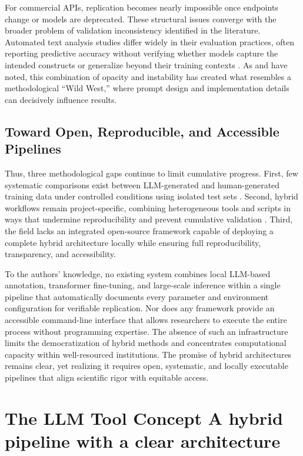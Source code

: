 \documentclass[12pt]{article}
\begin{document}
For commercial APIs, replication becomes nearly impossible once endpoints change or models are deprecated. These structural issues converge with the broader problem of validation inconsistency identified in the literature. Automated text analysis studies differ widely in their evaluation practices, often reporting predictive accuracy without verifying whether models capture the intended constructs or generalize beyond their training contexts \parencite{park_montgomery25, bernhard-harrer_etal25, glockner_etal20}. As \textcite{tornberg24b} and \textcite{atreja_etal24} have noted, this combination of opacity and instability has created what resembles a methodological “Wild West,” where prompt design and implementation details can decisively influence results.

\subsection{Toward Open, Reproducible, and Accessible Pipelines}

Thus, three methodological gaps continue to limit cumulative progress. First, few systematic comparisons exist between LLM-generated and human-generated training data under controlled conditions using isolated test sets \parencite{park_montgomery25, bernhard-harrer_etal25}. Second, hybrid workflows remain project-specific, combining heterogeneous tools and scripts in ways that undermine reproducibility and prevent cumulative validation \parencite{chen_etal23, weber_reichardt23}. Third, the field lacks an integrated open-source framework capable of deploying a complete hybrid architecture locally while ensuring full reproducibility, transparency, and accessibility. 

To the authors’ knowledge, no existing system combines local LLM-based annotation, transformer fine-tuning, and large-scale inference within a single pipeline that automatically documents every parameter and environment configuration for verifiable replication. Nor does any framework provide an accessible command-line interface that allows researchers to execute the entire process without programming expertise. The absence of such an infrastructure limits the democratization of hybrid methods and concentrates computational capacity within well-resourced institutions. The promise of hybrid architectures remains clear, yet realizing it requires open, systematic, and locally executable pipelines that align scientific rigor with equitable access.

\section{The LLM Tool Concept A hybrid pipeline with a clear architecture}
\end{document}
